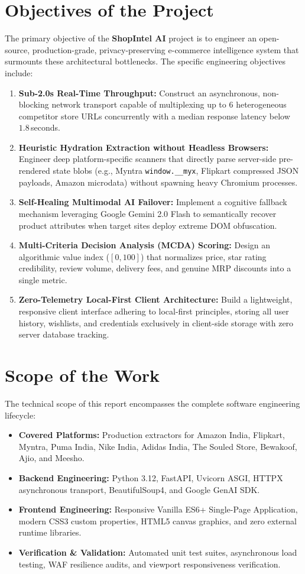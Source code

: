 \documentclass[12pt,a4paper,oneside]{report}
\begin{document}
\section{Objectives of the Project}
The primary objective of the \textbf{ShopIntel AI} project is to engineer an open-source, production-grade, privacy-preserving e-commerce intelligence system that surmounts these architectural bottlenecks. The specific engineering objectives include:
\begin{enumerate}
    \item \textbf{Sub-2.0s Real-Time Throughput:} Construct an asynchronous, non-blocking network transport capable of multiplexing up to 6 heterogeneous competitor store URLs concurrently with a median response latency below $1.8$\,seconds.
    \item \textbf{Heuristic Hydration Extraction without Headless Browsers:} Engineer deep platform-specific scanners that directly parse server-side pre-rendered state blobs (e.g., Myntra \texttt{window.\_\_myx}, Flipkart compressed JSON payloads, Amazon microdata) without spawning heavy Chromium processes.
    \item \textbf{Self-Healing Multimodal AI Failover:} Implement a cognitive fallback mechanism leveraging Google Gemini 2.0 Flash to semantically recover product attributes when target sites deploy extreme DOM obfuscation.
    \item \textbf{Multi-Criteria Decision Analysis (MCDA) Scoring:} Design an algorithmic value index ($[0, 100]$) that normalizes price, star rating credibility, review volume, delivery fees, and genuine MRP discounts into a single metric.
    \item \textbf{Zero-Telemetry Local-First Client Architecture:} Build a lightweight, responsive client interface adhering to local-first principles, storing all user history, wishlists, and credentials exclusively in client-side storage with zero server database tracking.
\end{enumerate}

\section{Scope of the Work}
The technical scope of this report encompasses the complete software engineering lifecycle:
\begin{itemize}
    \item \textbf{Covered Platforms:} Production extractors for Amazon India, Flipkart, Myntra, Puma India, Nike India, Adidas India, The Souled Store, Bewakoof, Ajio, and Meesho.
    \item \textbf{Backend Engineering:} Python 3.12, FastAPI, Uvicorn ASGI, HTTPX asynchronous transport, BeautifulSoup4, and Google GenAI SDK.
    \item \textbf{Frontend Engineering:} Responsive Vanilla ES6+ Single-Page Application, modern CSS3 custom properties, HTML5 canvas graphics, and zero external runtime libraries.
    \item \textbf{Verification \& Validation:} Automated unit test suites, asynchronous load testing, WAF resilience audits, and viewport responsiveness verification.
\end{itemize}
\end{document}
